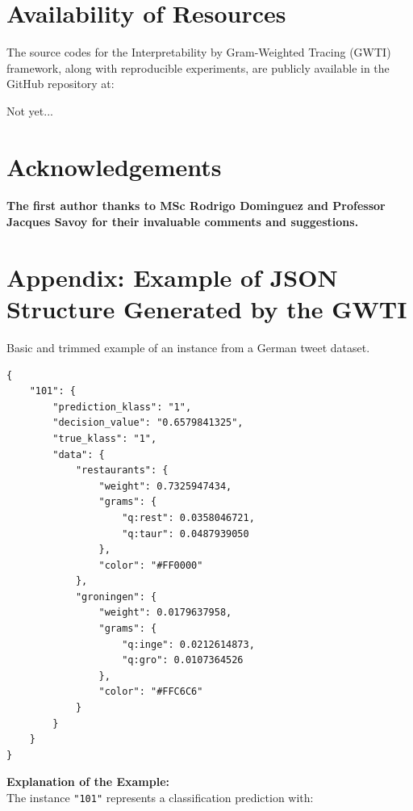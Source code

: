 \documentclass[runningheads,10pt]{llncs}
\begin{document}
\section*{Availability of Resources}

The source codes for the Interpretability by Gram-Weighted Tracing (\ac{GWTI}) framework, along with reproducible experiments, are publicly available in the GitHub repository at:

Not yet...

\section{Acknowledgements}
\paragraph{The first author thanks to MSc Rodrigo Dominguez and Professor Jacques Savoy for their invaluable comments and suggestions.} 

%



\newpage

\appendix

\section{Appendix: Example of JSON Structure Generated by the \ac{GWTI}}
\label{ap:example_structure}

Basic and trimmed example of an instance from a German tweet dataset.

\small
\begin{verbatim} 
{
    "101": {
        "prediction_klass": "1",
        "decision_value": "0.6579841325",
        "true_klass": "1",
        "data": {
            "restaurants": {
                "weight": 0.7325947434,
                "grams": {
                    "q:rest": 0.0358046721,
                    "q:taur": 0.0487939050
                },
                "color": "#FF0000"
            },
            "groningen": {
                "weight": 0.0179637958,
                "grams": {
                    "q:inge": 0.0212614873,
                    "q:gro": 0.0107364526
                },
                "color": "#FFC6C6"
            }
        }
    }
}
\end{verbatim}

\textbf{Explanation of the Example:} \\
The instance \texttt{"101"} represents a classification prediction with:
\end{document}
